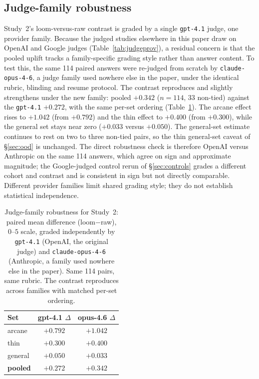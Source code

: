 \documentclass[10pt,twocolumn]{article}
\begin{document}
\subsection{Judge-family robustness}\label{sec:judgefamily}
Study~2's loom-versus-raw contrast is graded by a single \texttt{gpt-4.1} judge, one provider family. Because the judged studies elsewhere in this paper draw on OpenAI and Google judges (Table~\ref{tab:judgeprov}), a residual concern is that the pooled uplift tracks a family-specific grading style rather than answer content. To test this, the same 114 paired answers were re-judged from scratch by \texttt{claude-opus-4-6}, a judge family used nowhere else in the paper, under the identical rubric, blinding and resume protocol. The contrast reproduces and slightly strengthens under the new family: pooled $+0.342$ ($n=114$, 33 non-tied) against the \texttt{gpt-4.1} $+0.272$, with the same per-set ordering (Table~\ref{tab:judgefamily}). The arcane effect rises to $+1.042$ (from $+0.792$) and the thin effect to $+0.400$ (from $+0.300$), while the general set stays near zero ($+0.033$ versus $+0.050$). The general-set estimate continues to rest on two to three non-tied pairs, so the thin general-set caveat of \S\ref{sec:ood} is unchanged. The direct robustness check is therefore OpenAI versus Anthropic on the same 114 answers, which agree on sign and approximate magnitude; the Google-judged control rerun of \S\ref{sec:controls} grades a different cohort and contrast and is consistent in sign but not directly comparable. Different provider families limit shared grading style; they do not establish statistical independence.

\begin{table}[t]\centering\small
\caption{Judge-family robustness for Study~2: paired mean difference (loom$-$raw), $0$--$5$ scale,
graded independently by \texttt{gpt-4.1} (OpenAI, the original judge) and \texttt{claude-opus-4-6}
(Anthropic, a family used nowhere else in the paper). Same 114 pairs, same rubric. The contrast
reproduces across families with matched per-set ordering.}
\label{tab:judgefamily}
\begin{tabular}{lcc}
\toprule
Set & gpt-4.1 $\Delta$ & opus-4.6 $\Delta$ \\
\midrule
arcane          & $+0.792$ & $+1.042$ \\
thin            & $+0.300$ & $+0.400$ \\
general         & $+0.050$ & $+0.033$ \\
\midrule
\textbf{pooled} & $+0.272$ & $+0.342$ \\
\bottomrule
\end{tabular}
\end{table}
\end{document}
